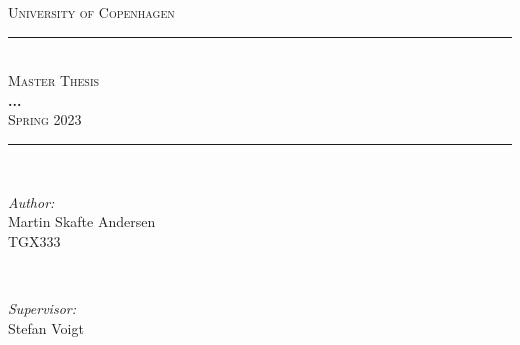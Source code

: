 \thispagestyle{empty}

\begin{titlepage}

\newcommand{\HRule}{\rule{\linewidth}{0.5mm}} %

\center %
 

\textsc{\LARGE University of Copenhagen}\\[1.5cm] %


\HRule \\[0.4cm]
\textsc{\Large Master Thesis}\\[0.5cm] 
{ \huge \bfseries ...}\\[0.4cm] %
\textsc{\Large Spring 2023}\\[0.5cm] 
\HRule \\[1.5cm]
 

\begin{minipage}{0.4\textwidth}
\begin{flushleft} \large
\emph{Author:}\\
Martin Skafte Andersen \\ TGX333 \\
\end{flushleft}
\end{minipage}
~
\begin{minipage}{0.4\textwidth}
\begin{flushright} \large
\emph{Supervisor:} \\
Stefan Voigt \\
\end{flushright}
\end{minipage}\\[5cm]
\begin{flushleft}
    

\end{flushleft}
\end{titlepage}
